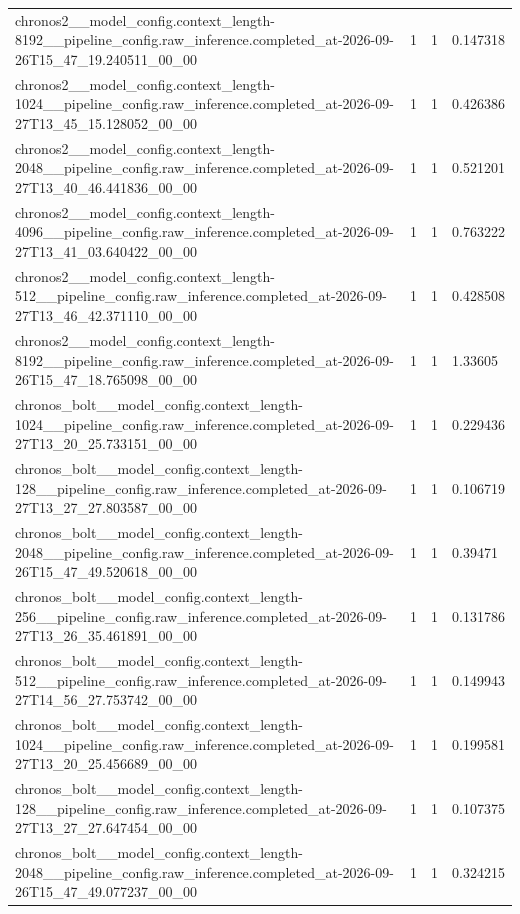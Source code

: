 \begin{tabular}{llll}
chronos2\_\_model\_config.context\_length-8192\_\_pipeline\_config.raw\_inference.completed\_at-2026-09-26T15\_47\_19.240511\_00\_00 & 1 & 1 & 0.147318 \\
chronos2\_\_model\_config.context\_length-1024\_\_pipeline\_config.raw\_inference.completed\_at-2026-09-27T13\_45\_15.128052\_00\_00 & 1 & 1 & 0.426386 \\
chronos2\_\_model\_config.context\_length-2048\_\_pipeline\_config.raw\_inference.completed\_at-2026-09-27T13\_40\_46.441836\_00\_00 & 1 & 1 & 0.521201 \\
chronos2\_\_model\_config.context\_length-4096\_\_pipeline\_config.raw\_inference.completed\_at-2026-09-27T13\_41\_03.640422\_00\_00 & 1 & 1 & 0.763222 \\
chronos2\_\_model\_config.context\_length-512\_\_pipeline\_config.raw\_inference.completed\_at-2026-09-27T13\_46\_42.371110\_00\_00 & 1 & 1 & 0.428508 \\
chronos2\_\_model\_config.context\_length-8192\_\_pipeline\_config.raw\_inference.completed\_at-2026-09-26T15\_47\_18.765098\_00\_00 & 1 & 1 & 1.33605 \\
chronos\_bolt\_\_model\_config.context\_length-1024\_\_pipeline\_config.raw\_inference.completed\_at-2026-09-27T13\_20\_25.733151\_00\_00 & 1 & 1 & 0.229436 \\
chronos\_bolt\_\_model\_config.context\_length-128\_\_pipeline\_config.raw\_inference.completed\_at-2026-09-27T13\_27\_27.803587\_00\_00 & 1 & 1 & 0.106719 \\
chronos\_bolt\_\_model\_config.context\_length-2048\_\_pipeline\_config.raw\_inference.completed\_at-2026-09-26T15\_47\_49.520618\_00\_00 & 1 & 1 & 0.39471 \\
chronos\_bolt\_\_model\_config.context\_length-256\_\_pipeline\_config.raw\_inference.completed\_at-2026-09-27T13\_26\_35.461891\_00\_00 & 1 & 1 & 0.131786 \\
chronos\_bolt\_\_model\_config.context\_length-512\_\_pipeline\_config.raw\_inference.completed\_at-2026-09-27T14\_56\_27.753742\_00\_00 & 1 & 1 & 0.149943 \\
chronos\_bolt\_\_model\_config.context\_length-1024\_\_pipeline\_config.raw\_inference.completed\_at-2026-09-27T13\_20\_25.456689\_00\_00 & 1 & 1 & 0.199581 \\
chronos\_bolt\_\_model\_config.context\_length-128\_\_pipeline\_config.raw\_inference.completed\_at-2026-09-27T13\_27\_27.647454\_00\_00 & 1 & 1 & 0.107375 \\
chronos\_bolt\_\_model\_config.context\_length-2048\_\_pipeline\_config.raw\_inference.completed\_at-2026-09-26T15\_47\_49.077237\_00\_00 & 1 & 1 & 0.324215 \\

\end{tabular}
